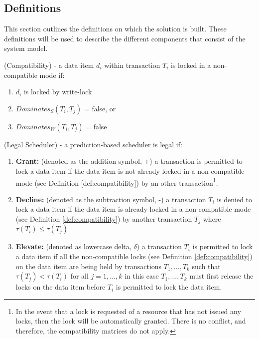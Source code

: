 \subsection{Definitions}
\label{sec:definitions}
This section outlines the definitions on which the solution is built. These definitions will be used to describe the different components that consist of the system model.

\begin{definition}
\label{def:compatibility}
(Compatibility) - a data item $d_{i}$ within transaction $T_{i}$ is locked in a non-compatible mode if:

\begin{enumerate}
  \item $d_{i}$ is locked by write-lock
  \item $Dominates_{S}(T_{i},T_{j})$ = false, or
  \item $Dominates_{W}(T_{i},T_{j})$ = false
\end{enumerate}
\end{definition}

\begin{definition}
\label{def:legal_scheduler}
 (Legal Scheduler) - a prediction-based scheduler is legal if:
 
 \begin{enumerate}
    \item \textbf{Grant:} (denoted as the addition symbol, +) a transaction is permitted to lock a data item if the data item is not already locked in a non-compatible mode (see Definition \ref{def:compatibility}) by an other transaction\footnote{In the event that a lock is requested of a resource that has not issued any locks, then the lock will be automatically granted. There is no conflict, and therefore, the compatibility matrices do not apply.}.
    \item \textbf{Decline:} (denoted as the subtraction symbol, -) a transaction $T_{i}$ is denied to lock a data item if the data item is already locked in a non-compatible mode (see Definition \ref{def:compatibility}) by another transaction $T_{j}$ where $\tau(T_{i}) \le \tau(T_{j})$
    \item \textbf{Elevate:} (denoted as lowercase delta, $\delta$) a transaction $T_{i}$ is permitted to lock a data item if all the non-compatible locks (see Definition \ref{def:compatibility}) on the data item are being held by transactions $T_{1}, ... , T_{k}$ such that $\tau(T_{j}) < \tau(T_{i})$ for all $j = 1, ..., k$ in this case $T_{1}, ... , T_{k}$ must first release the locks on the data item before $T_{i}$ is permitted to lock the data item.
 \end{enumerate}
\end{definition}

